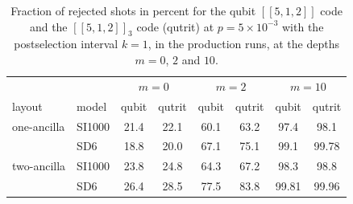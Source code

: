 \begin{table}[tp]
  \centering
  \small
  \begin{tabular}{ll|cc|cc|cc}
    \hline
    & & \multicolumn{2}{c|}{$m = 0$} & \multicolumn{2}{c|}{$m = 2$} & \multicolumn{2}{c}{$m = 10$} \\
    layout & model & qubit & qutrit & qubit & qutrit & qubit & qutrit \\
    \hline
    one-ancilla & SI1000 & 21.4 & 22.1 & 60.1 & 63.2 & 97.4 & 98.1 \\
     & SD6 & 18.8 & 20.0 & 67.1 & 75.1 & 99.1 & 99.78 \\
    two-ancilla & SI1000 & 23.8 & 24.8 & 64.3 & 67.2 & 98.3 & 98.8 \\
     & SD6 & 26.4 & 28.5 & 77.5 & 83.8 & 99.81 & 99.96 \\
    \hline
  \end{tabular}
  \caption{Fraction of rejected shots in percent for the qubit $[[5,1,2]]$ code and the $[[5,1,2]]_3$ code (qutrit) at $p = 5\times10^{-3}$ with the postselection interval $k = 1$, in the production runs, at the depths $m = 0$, $2$ and $10$.}
  \label{tab:rej_qubit}
\end{table}
